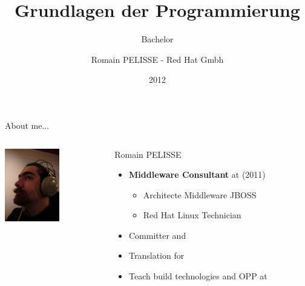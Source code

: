 \documentclass[handout]{beamer}
\title{Grundlagen der Programmierung}
\subtitle{Bachelor}
\author{Romain PELISSE - Red Hat Gmbh}
\institute{Humboldt Universität, Berlin}
\date{2012}
\begin{document}
  \begin{frame}
    \titlepage
  \end{frame}

  \begin{frame}{About me...}
    \begin{columns}

    \begin{column}[l]{.3\textwidth}
      \begin{center}
        \includegraphics[height=120px]{../img/rpe.jpg}
      \end{center}
    \end{column}

    \begin{column}[r]{.7\textwidth}
      \begin{block}{Romain PELISSE}
        \begin{itemize}
          \item \textbf{Middleware Consultant} at  (2011)
          \begin{itemize}
            \item Architecte Middleware JBOSS
            \item Red Hat Linux Technician
          \end{itemize}
          \item Committer  and 
          \item Translation for 
          \item Teach build technologies and OPP at 
        \end{itemize}
      \end{block}
    \end{column}
   \end{columns}
 \end{frame}

 
\end{document}
